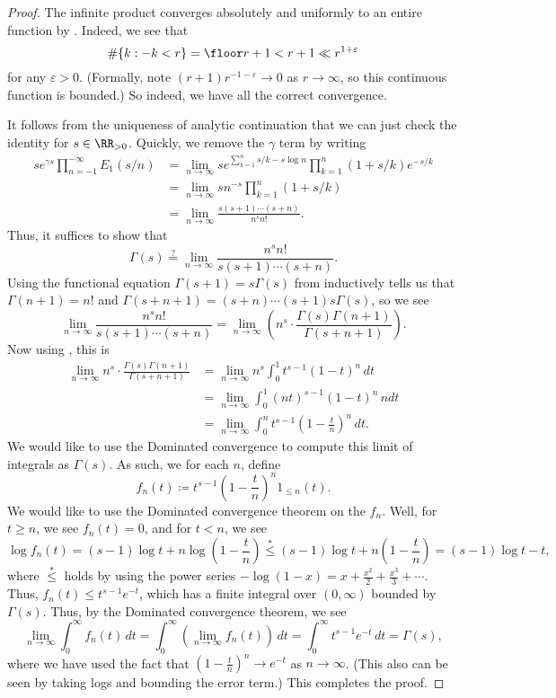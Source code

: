 \documentclass[../notes.tex]{subfiles}
\begin{document}
\begin{proof}
	The infinite product converges absolutely and uniformly to an entire function by . Indeed, we see that
	\[\#\{k:-k<r\}=\floor r+1<r+1\ll r^{1+\varepsilon}\]
	for any $\varepsilon>0$. (Formally, note $(r+1)r^{-1-\varepsilon}\to0$ as $r\to\infty$, so this continuous function is bounded.) So indeed, we have all the correct convergence.

	It follows from the uniqueness of analytic continuation that we can just check the identity for $s\in\RR_{>0}$. Quickly, we remove the $\gamma$ term by writing
	\begin{align*}
		se^{\gamma s}\prod_{n=-1}^{-\infty}E_1(s/n) &= \lim_{n\to\infty}se^{\sum_{k=1}^ns/k-s\log n}\prod_{k=1}^n(1+s/k)e^{-s/k} \\
		&= \lim_{n\to\infty}sn^{-s}\prod_{k=1}^n(1+s/k) \\
		&= \lim_{n\to\infty}\frac{s(s+1)\cdots(s+n)}{n^sn!}.
	\end{align*}
	Thus, it suffices to show that
	\[\Gamma(s)\stackrel?=\lim_{n\to\infty}\frac{n^sn!}{s(s+1)\cdots(s+n)}.\]
	Using the functional equation $\Gamma(s+1)=s\Gamma(s)$ from  inductively tells us that $\Gamma(n+1)=n!$ and $\Gamma(s+n+1)=(s+n)\cdots(s+1)s\Gamma(s)$, so we see
	\[\lim_{n\to\infty}\frac{n^sn!}{s(s+1)\cdots(s+n)}=\lim_{n\to\infty}\left(n^s\cdot\frac{\Gamma(s)\Gamma(n+1)}{\Gamma(s+n+1)}\right).\]
	Now using , this is
	\begin{align*}
		\lim_{n\to\infty}n^s\cdot\frac{\Gamma(s)\Gamma(n+1)}{\Gamma(s+n+1)} &= \lim_{n\to\infty}n^s\int_0^1t^{s-1}(1-t)^n\,dt \\
		&= \lim_{n\to\infty}\int_0^1(nt)^{s-1}(1-t)^n\,ndt \\
		&= \lim_{n\to\infty}\int_0^nt^{s-1}\left(1-\frac tn\right)^n\,dt.
	\end{align*}
	We would like to use the Dominated convergence to compute this limit of integrals as $\Gamma(s)$. As such, we for each $n$, define
	\[f_n(t)\coloneqq t^{s-1}\left(1-\frac tn\right)^n1_{\le n}(t).\]
	We would like to use the Dominated convergence theorem on the $f_n$. Well, for $t\ge n$, we see $f_n(t)=0$, and for $t<n$, we see
	\[\log f_n(t)=(s-1)\log t+n\log\left(1-\frac tn\right)\stackrel*\le(s-1)\log t+n\left(1-\frac tn\right)=(s-1)\log t-t,\]
	where $\stackrel*\le$ holds by using the power series $-\log(1-x)=x+\frac{x^2}2+\frac{x^3}3+\cdots$. Thus, $f_n(t)\le t^{s-1}e^{-t}$, which has a finite integral over $(0,\infty)$ bounded by $\Gamma(s)$. Thus, by the Dominated convergence theorem, we see
	\[\lim_{n\to\infty}\int_0^\infty f_n(t)\,dt=\int_0^\infty\left(\lim_{n\to\infty}f_n(t)\right)\,dt=\int_0^\infty t^{s-1}e^{-t}\,dt=\Gamma(s),\]
	where we have used the fact that $\left(1-\frac tn\right)^n\to e^{-t}$ as $n\to\infty$. (This also can be seen by taking logs and bounding the error term.) This completes the proof.
\end{proof}
\end{document}
